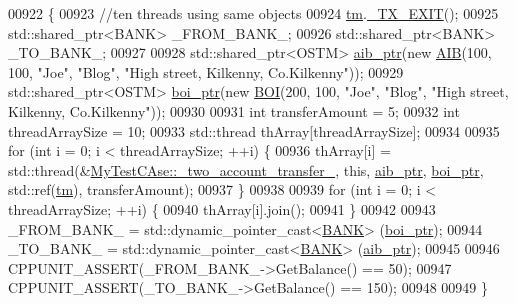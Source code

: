 \begin{DoxyCode}
00922                                                              \{
00923     \textcolor{comment}{//ten threads using same objects}
00924     \hyperlink{class_my_test_c_ase_a422e6e5d4ddedea384be96031c89b72b_a422e6e5d4ddedea384be96031c89b72b}{tm}.\hyperlink{class_t_m_a5e2d1127f2429f2f524d25f430eade06_a5e2d1127f2429f2f524d25f430eade06}{\_TX\_EXIT}();
00925     std::shared\_ptr<BANK> \_FROM\_BANK\_;
00926     std::shared\_ptr<BANK> \_TO\_BANK\_;
00927     
00928     std::shared\_ptr<OSTM> \hyperlink{class_my_test_c_ase_adad50e8278b64aa0321000b528e5362c_adad50e8278b64aa0321000b528e5362c}{aib\_ptr}(\textcolor{keyword}{new} \hyperlink{class_a_i_b}{AIB}(100, 100, \textcolor{stringliteral}{"Joe"}, \textcolor{stringliteral}{"Blog"}, \textcolor{stringliteral}{"High street, Kilkenny,
       Co.Kilkenny"}));
00929     std::shared\_ptr<OSTM> \hyperlink{class_my_test_c_ase_a5554de9e3e6393a89c66c036c529720b_a5554de9e3e6393a89c66c036c529720b}{boi\_ptr}(\textcolor{keyword}{new} \hyperlink{class_b_o_i}{BOI}(200, 100, \textcolor{stringliteral}{"Joe"}, \textcolor{stringliteral}{"Blog"}, \textcolor{stringliteral}{"High street, Kilkenny,
       Co.Kilkenny"}));
00930     
00931     \textcolor{keywordtype}{int} transferAmount = 5;
00932     \textcolor{keywordtype}{int} threadArraySize = 10; 
00933     std::thread thArray[threadArraySize];
00934 
00935     \textcolor{keywordflow}{for} (\textcolor{keywordtype}{int} i = 0; i < threadArraySize; ++i) \{
00936         thArray[i] = std::thread(&\hyperlink{class_my_test_c_ase_af0cc86421d281cc4a583a394ae86dbdd_af0cc86421d281cc4a583a394ae86dbdd}{MyTestCAse::\_two\_account\_transfer\_}, \textcolor{keyword}{
      this}, \hyperlink{class_my_test_c_ase_adad50e8278b64aa0321000b528e5362c_adad50e8278b64aa0321000b528e5362c}{aib\_ptr}, \hyperlink{class_my_test_c_ase_a5554de9e3e6393a89c66c036c529720b_a5554de9e3e6393a89c66c036c529720b}{boi\_ptr}, std::ref(\hyperlink{class_my_test_c_ase_a422e6e5d4ddedea384be96031c89b72b_a422e6e5d4ddedea384be96031c89b72b}{tm}), transferAmount);
00937     \}
00938     
00939     \textcolor{keywordflow}{for} (\textcolor{keywordtype}{int} i = 0; i < threadArraySize; ++i) \{
00940         thArray[i].join();
00941     \}
00942     
00943     \_FROM\_BANK\_ = std::dynamic\_pointer\_cast<\hyperlink{class_b_a_n_k}{BANK}> (\hyperlink{class_my_test_c_ase_a5554de9e3e6393a89c66c036c529720b_a5554de9e3e6393a89c66c036c529720b}{boi\_ptr});
00944     \_TO\_BANK\_ = std::dynamic\_pointer\_cast<\hyperlink{class_b_a_n_k}{BANK}> (\hyperlink{class_my_test_c_ase_adad50e8278b64aa0321000b528e5362c_adad50e8278b64aa0321000b528e5362c}{aib\_ptr});
00945 
00946     CPPUNIT\_ASSERT(\_FROM\_BANK\_->GetBalance() == 50);
00947     CPPUNIT\_ASSERT(\_TO\_BANK\_->GetBalance() == 150);
00948     
00949 \}
\end{DoxyCode}


